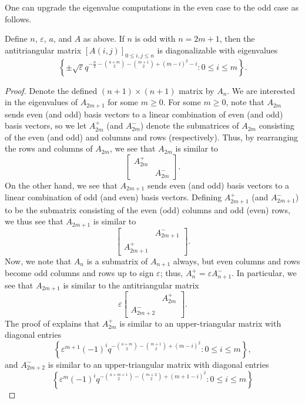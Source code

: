 One can upgrade the eigenvalue computations in the even case to the odd case as follows.
\begin{proposition} \label{prop:helper-matrix-odd}
    Define $n$, $\varepsilon$, $a$, and $A$ as above. If $n$ is odd with $n=2m+1$, then the antitriangular matrix $[A(i,j)]_{0\le i,j\le n}$ is diagonalizable with eigenvalues
    \[\left\{\pm\sqrt\varepsilon q^{-\frac a2-\binom{a+m}2-\binom{m+1}2+(m-i)^2-i}:0\le i\le m\right\}.\]
\end{proposition}
\begin{proof}
    Denote the defined $(n+1)\times(n+1)$ matrix by $A_n$. We are interested in the eigenvalues of $A_{2m+1}$ for some $m\ge0$. For some $m\ge0$, note that $A_{2m}$ sends even (and odd) basis vectors to a linear combination of even (and odd) basis vectors, so we let $A_{2m}^+$ (and $A_{2m}^-$) denote the submatrices of $A_{2m}$ consisting of the even (and odd) and columns and rows (respectively). Thus, by rearranging the rows and columns of $A_{2m}$, we see that $A_{2m}$ is similar to 
    \[\begin{bmatrix}
        A_{2m}^+ \\ & A_{2m}^-
    \end{bmatrix}.\]
    On the other hand, we see that $A_{2m+1}$ sends even (and odd) basis vectors to a linear combination of odd (and even) basis vectors. Defining $A_{2m+1}^+$ (and $A_{2m+1}^-$) to be the submatrix consisting of the even (odd) columns and odd (even) rows, we thus see that $A_{2m+1}$ is similar to
    \[\begin{bmatrix}
        & A_{2m+1}^- \\ A_{2m+1}^+
    \end{bmatrix}.\]
    Now, we note that $A_n$ is a submatrix of $A_{n+1}$ always, but even columns and rows become odd columns and rows up to sign $\varepsilon$; thus, $A_n^+=\varepsilon A_{n+1}^-$. In particular, we see that $A_{2m+1}$ is similar to the antitriangular matrix
    \[\varepsilon\begin{bmatrix}
        & A_{2m}^+ \\ A_{2m+2}^-
    \end{bmatrix}.\]
    The proof of  explains that $A_{2m}^+$ is similar to an upper-triangular matrix with diagonal entries
    \[\left\{\varepsilon^{m+1}(-1)^{i}q^{-\binom{a+m}2-\binom{m+1}2+\left(m-i\right)^2}:0\le i\le m\right\},\]
    and $A_{2m+2}^-$ is similar to an upper-triangular matrix with diagonal entries
    \[\left\{\varepsilon^{m}(-1)^{i}q^{-\binom{a+m+1}2-\binom{m+2}2+(m+1-i)^2}:0\le i\le m\right\}\]

\end{proof}
